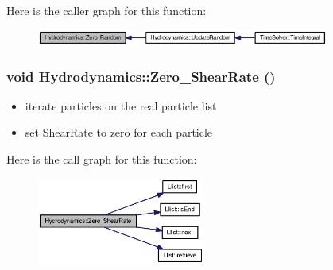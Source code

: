 Here is the caller graph for this function:\nopagebreak
\begin{figure}[H]
\begin{center}
\leavevmode
\includegraphics[width=272pt]{classHydrodynamics_f67579320cbdccaf49bbdf3dfb13f23c_icgraph}
\end{center}
\end{figure}
\hypertarget{classHydrodynamics_049f88c2f97863edae4489618dc9e853}{
\subsubsection[{Zero\_\-ShearRate}]{\setlength{\rightskip}{0pt plus 5cm}void Hydrodynamics::Zero\_\-ShearRate ()}}
\label{classHydrodynamics_049f88c2f97863edae4489618dc9e853}




\begin{itemize}
\item iterate particles on the real particle list\end{itemize}


\begin{itemize}
\item set ShearRate to zero for each particle \end{itemize}


Here is the call graph for this function:\nopagebreak
\begin{figure}[H]
\begin{center}
\leavevmode
\includegraphics[width=156pt]{classHydrodynamics_049f88c2f97863edae4489618dc9e853_cgraph}
\end{center}
\end{figure}


